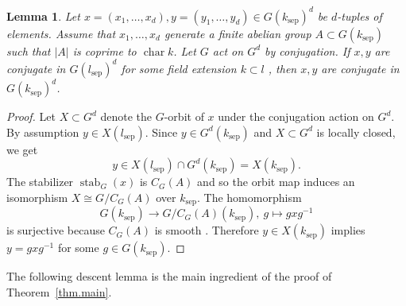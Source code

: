 \documentclass[12pt]{amsart}
\numberwithin{equation}{section}
\newtheorem{lemma}[theorem]{Lemma}
\theoremstyle{definition}
\newcommand{\sep}{\operatorname{sep}}
\newcommand{\Char}{\operatorname{char}}
\newcommand{\stab}{\operatorname{stab}}
\newcommand{\ksep}{k_{\sep}}
\begin{document}
\begin{lemma}\label{lem.conjugation}
    Let $x = (x_1,\dots,x_d), y = (y_1,\dots,y_d)\in G(\ksep)^d$ be $d$-tuples of elements. Assume that $x_1,\dots,x_d$ generate a finite abelian group $A\subset G(\ksep)$ such that $|A|$ is coprime to $\Char k$. Let $G$ act on $G^d$ by conjugation. If $x,y$ are conjugate in $G(l_{\sep})^d$  for some field extension $k\subset l$ , then $x,y$ are conjugate in $G(k_{\sep})^d$.
\end{lemma}
\begin{proof}
     Let $X\subset G^d$ denote the $G$-orbit of $x$ under the conjugation action on $G^d$.  By assumption $y\in X(l_{\sep})$. Since $y\in G^d(\ksep)$ and $X\subset G^d$ is locally closed, we get $$y\in X(l_{\sep})\cap G^d(\ksep) = X(\ksep).$$ The stabilizer $\stab_{G}(x)$ is $C_G(A)$ and so the orbit map induces an isomorphism $X \cong G/C_G(A)$ \cite[Corollary 7.13]{milne2017algebraic} over $\ksep$. The homomorphism $$G(\ksep)\to G/C_G(A)(\ksep), \ g\mapsto gxg^{-1}$$ is surjective because $C_G(A)$ is smooth \cite[Theorem 13.9]{milne2017algebraic}. Therefore $y\in X(\ksep)$ implies $y= gxg^{-1}$ for some $g\in G(\ksep)$.
\end{proof}
The following descent lemma is the main ingredient of the proof of Theorem~\ref{thm.main}.
\end{document}
